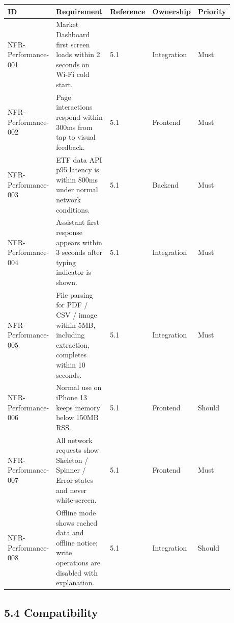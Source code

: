 \begingroup
\small
\begin{longtable}{L{0.18\linewidth}L{0.30\linewidth}L{0.18\linewidth}L{0.12\linewidth}L{0.10\linewidth}}
\toprule
\textbf{ID} & \textbf{Requirement} & \textbf{Reference} & \textbf{Ownership} & \textbf{Priority} \\
\midrule
NFR-Performance-001 & Market Dashboard first screen loads within 2 seconds on Wi-Fi cold start. & 5.1 & Integration & Must \\
NFR-Performance-002 & Page interactions respond within 300ms from tap to visual feedback. & 5.1 & Frontend & Must \\
NFR-Performance-003 & ETF data API p95 latency is within 800ms under normal network conditions. & 5.1 & Backend & Must \\
NFR-Performance-004 & Assistant first response appears within 3 seconds after typing indicator is shown. & 5.1 & Integration & Must \\
NFR-Performance-005 & File parsing for PDF / CSV / image within 5MB, including extraction, completes within 10 seconds. & 5.1 & Integration & Must \\
NFR-Performance-006 & Normal use on iPhone 13 keeps memory below 150MB RSS. & 5.1 & Frontend & Should \\
NFR-Performance-007 & All network requests show Skeleton / Spinner / Error states and never white-screen. & 5.1 & Frontend & Must \\
NFR-Performance-008 & Offline mode shows cached data and offline notice; write operations are disabled with explanation. & 5.1 & Integration & Should \\
\bottomrule
\end{longtable}
\endgroup

\subsection{5.4 Compatibility}

